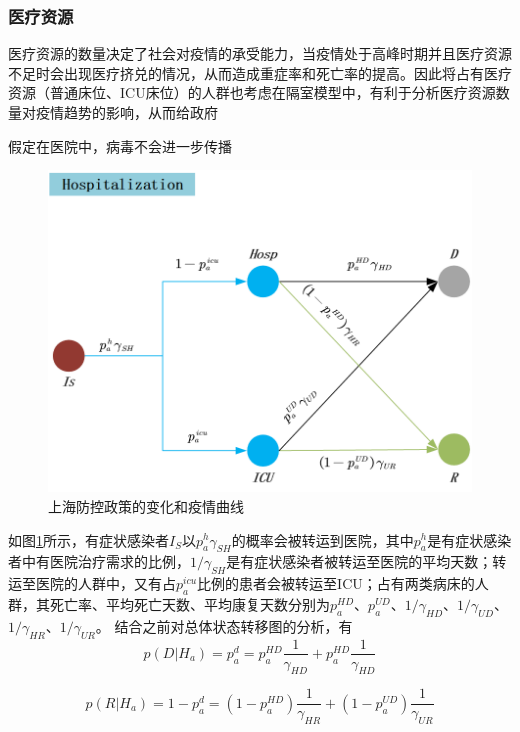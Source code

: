 \documentclass[bwprint]{gmcmthesis}
\numberwithin{figure}{section}
\begin{document}
\subsubsection{医疗资源}
医疗资源的数量决定了社会对疫情的承受能力，当疫情处于高峰时期并且医疗资源不足时会出现医疗挤兑的情况，从而造成重症率和死亡率的提高。因此将占有医疗资源（普通床位、ICU床位）的人群也考虑在隔室模型中，有利于分析医疗资源数量对疫情趋势的影响，从而给政府
\par 假定在医院中，病毒不会进一步传播
\begin{figure}[!h]
\centering
\includegraphics[width=.75\textwidth]{hospital.png}
\caption{上海防控政策的变化和疫情曲线}
\label{hos}
\end{figure}
\par 如图\ref{hos}所示，有症状感染者$I_S$以$p_a^h\gamma_{SH}$的概率会被转运到医院，其中$p_a^h$是有症状感染者中有医院治疗需求的比例，$1/\gamma_{SH}$是有症状感染者被转运至医院的平均天数；转运至医院的人群中，又有占$p_a^{icu}$比例的患者会被转运至ICU；占有两类病床的人群，其死亡率、平均死亡天数、平均康复天数分别为$p_a^{HD}$、$p_a^{UD}$、$1/\gamma_{HD}$、$1/\gamma_{UD}$、$1/\gamma_{HR}$、$1/\gamma_{UR}$。
结合之前对总体状态转移图的分析，有
\begin{equation}
p(D\vert H_a)=p_a^d=p_a^{HD}\frac{1}{\gamma_{HD}}+p_a^{HD}\frac{1}{\gamma_{HD}}
\end{equation}

\begin{equation}
p(R\vert H_a)=1-p_a^d=(1-p_a^{HD})\frac{1}{\gamma_{HR}}+(1-p_a^{UD})\frac{1}{\gamma_{UR}}
\end{equation}
\end{document}
